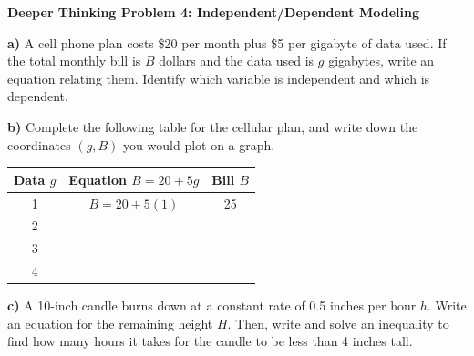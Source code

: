 \documentclass[12pt, letterpaper, fleqn]{article}
\begin{document}
\begin{tcolorbox}[colback=white, colframe=black, boxrule=1pt, arc=4mm, left=6mm, right=6mm, top=5mm, bottom=5mm]
\textbf{Deeper Thinking Problem 4: Independent/Dependent Modeling}

\medskip

\noindent
\textbf{a)} A cell phone plan costs \$20 per month plus \$5 per gigabyte of data used. If the total monthly bill is $B$ dollars and the data used is $g$ gigabytes, write an equation relating them. Identify which variable is independent and which is dependent.

\vspace{4cm}

\noindent
\textbf{b)} Complete the following table for the cellular plan, and write down the coordinates $(g, B)$ you would plot on a graph.

\vspace{1cm}

\begin{center}
\begin{tabular}{|c|c|c|}
\hline
Data $g$ & Equation $B = 20 + 5g$ & Bill $B$ \\ \hline
1 & $B = 20 + 5(1)$ & 25 \\ \hline
2 & & \\ \hline
3 & & \\ \hline
4 & & \\ \hline
\end{tabular}
\end{center}

\vspace{2cm}

\noindent
\textbf{c)} A 10-inch candle burns down at a constant rate of 0.5 inches per hour $h$. Write an equation for the remaining height $H$. Then, write and solve an inequality to find how many hours it takes for the candle to be less than 4 inches tall.

\vspace{5cm}
\end{tcolorbox}
\end{document}
